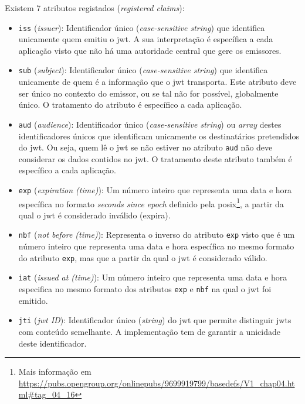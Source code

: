 \begin{itemize}
    Existem 7 atributos registados (\textit{registered claims}):~\cite{jwthandbook}
    \begin{itemize}
        \item \texttt{iss} (\textit{issuer}): Identificador único (\textit{case-sensitive string}) que identifica unicamente quem emitiu o \acrshort{jwt}. A sua interpretação é específica a cada aplicação visto que não há uma autoridade central que gere os emissores.
        \item \texttt{sub} (\textit{subject}): Identificador único (\textit{case-sensitive string}) que identifica unicamente de quem é a informação que o \acrshort{jwt} transporta. Este atributo deve ser único no contexto do emissor, ou se tal não for possível, globalmente único. O tratamento do atributo é específico a cada aplicação. 
        \item \texttt{aud} (\textit{audience}): Identificador único (\textit{case-sensitive string}) ou \textit{array} destes identificadores únicos que identificam unicamente os destinatários pretendidos do \acrshort{jwt}. Ou seja, quem lê o \acrshort{jwt} se não estiver no atributo \texttt{aud} não deve considerar os dados contidos no \acrshort{jwt}. O tratamento deste atributo também é específico a cada aplicação. 
        \item \texttt{exp} (\textit{expiration (time)}): Um número inteiro que representa uma data e hora específica no formato \textit{seconds since epoch} definido pela \acrshort{posix}\footnote{Mais informação em \url{https://pubs.opengroup.org/onlinepubs/9699919799/basedefs/V1\_chap04.html\#tag\_04\_16}}, a partir da qual o \acrshort{jwt} é considerado inválido (expira).
        \item \texttt{nbf} (\textit{not before (time)}): Representa o inverso do atributo \texttt{exp} visto que é um número inteiro que representa uma data e hora específica no mesmo formato do atributo \texttt{exp}, mas que a partir da qual o \acrshort{jwt} é considerado válido.
        \item \texttt{iat} (\textit{issued at (time)}): Um número inteiro que representa uma data e hora especifica no mesmo formato dos atributos \texttt{exp} e \texttt{nbf} na qual o \acrshort{jwt} foi emitido.
        \item \texttt{jti} (\textit{\acrshort{jwt} ID}): Identificador único (\textit{string}) do \acrshort{jwt} que permite distinguir \acrshort{jwt}s com conteúdo semelhante. A implementação tem de garantir a unicidade deste identificador.
    \end{itemize}


\end{itemize}
